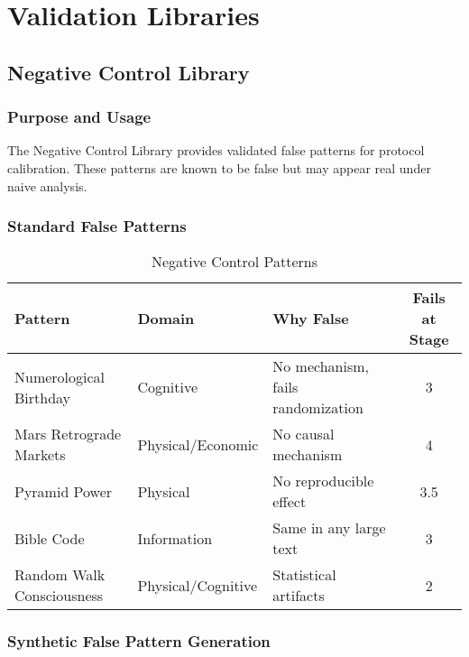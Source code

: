 \documentclass[12pt,oneside]{memoir}
\theoremstyle{plain}
\theoremstyle{definition}
\theoremstyle{remark}
\begin{document}
\part{Validation Libraries}

\chapter{Negative Control Library}

\section{Purpose and Usage}

The Negative Control Library provides validated false patterns for protocol calibration. These patterns are known to be false but may appear real under naive analysis.

\section{Standard False Patterns}

\begin{table}[h]
\centering
\caption{Negative Control Patterns}
\begin{tabular}{L{3cm}L{2cm}L{4cm}c}
\toprule
\textbf{Pattern} & \textbf{Domain} & \textbf{Why False} & \textbf{Fails at Stage} \\
\midrule
Numerological Birthday & Cognitive & No mechanism, fails randomization & 3 \\
Mars Retrograde Markets & Physical/Economic & No causal mechanism & 4 \\
Pyramid Power & Physical & No reproducible effect & 3.5 \\
Bible Code & Information & Same in any large text & 3 \\
Random Walk Consciousness & Physical/Cognitive & Statistical artifacts & 2 \\
\bottomrule
\end{tabular}
\end{table}

\section{Synthetic False Pattern Generation}
\end{document}
